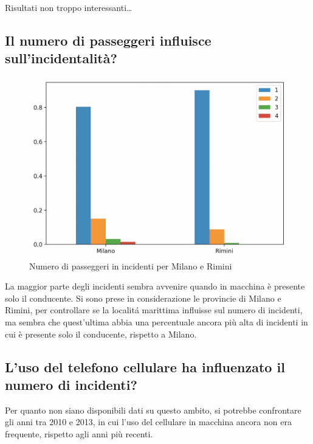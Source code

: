 \documentclass[a4paper]{report}
\begin{document}


Risultati non troppo interessanti\dots


\subsection{Il numero di passeggeri influisce sull'incidentalità?}

\begin{figure}
    \includegraphics[width=\linewidth]{../src/incidenti/incidenti_senza_coords/tipo_veicoli/passeggeri.png}
    \caption{Numero di passeggeri in incidenti per Milano e Rimini}
    \label{fig:passeggeri_milano_rimini}
\end{figure}

La maggior parte degli incidenti sembra avvenire quando in macchina è presente solo il conducente.
Si sono prese in considerazione le provincie di Milano e Rimini, per controllare se la localit\'a 
marittima influisse sul numero di incidenti, ma sembra che quest'ultima abbia una percentuale 
ancora più alta di incidenti in cui è presente solo il conducente, rispetto a Milano.


\subsection{L'uso del telefono cellulare ha influenzato il numero di incidenti?}

Per quanto non siano disponibili dati su questo ambito, si potrebbe confrontare gli anni tra 2010 e 2013, 
in cui l'uso del cellulare in macchina ancora non era frequente, rispetto agli anni più recenti.
\end{document}
